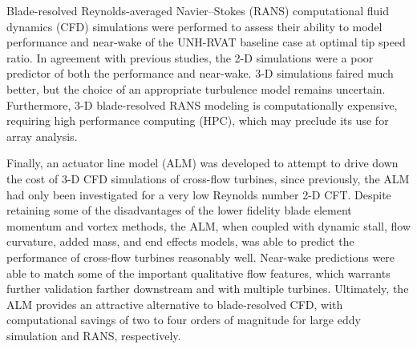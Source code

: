 \begin{Abstractpage}
{Blade-resolved Reynolds-averaged Navier--Stokes (RANS) computational fluid
dynamics (CFD) simulations were performed to assess their ability to model
performance and near-wake of the UNH-RVAT baseline case at optimal tip speed
ratio. In agreement with previous studies, the 2-D simulations were a poor
predictor of both the performance and near-wake. 3-D simulations faired much
better, but the choice of an appropriate turbulence model remains uncertain.
Furthermore, 3-D blade-resolved RANS modeling is computationally expensive,
requiring high performance computing (HPC), which may preclude its use for array
analysis.

Finally, an actuator line model (ALM) was developed to attempt to drive down the
cost of 3-D CFD simulations of cross-flow turbines, since previously, the ALM
had only been investigated for a very low Reynolds number 2-D CFT. Despite
retaining some of the disadvantages of the lower fidelity blade element momentum
and vortex methods, the ALM, when coupled with dynamic stall, flow curvature,
added mass, and end effects models, was able to predict the performance of
cross-flow turbines reasonably well. Near-wake predictions were able to match
some of the important qualitative flow features, which warrants further
validation farther downstream and with multiple turbines. Ultimately, the ALM
provides an attractive alternative to blade-resolved CFD, with computational
savings of two to four orders of magnitude for large eddy simulation and RANS,
respectively.

}


\end{Abstractpage}
